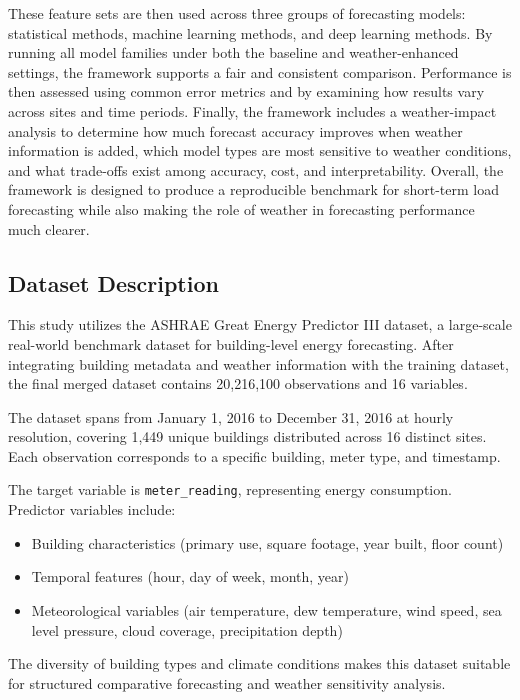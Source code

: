 \documentclass[conference]{IEEEtran}
\begin{document}
These feature sets are then used across three groups of forecasting models: statistical methods, machine learning methods, and deep learning methods. By running all model families under both the baseline and weather-enhanced settings, the framework supports a fair and consistent comparison. Performance is then assessed using common error metrics and by examining how results vary across sites and time periods. Finally, the framework includes a weather-impact analysis to determine how much forecast accuracy improves when weather information is added, which model types are most sensitive to weather conditions, and what trade-offs exist among accuracy, cost, and interpretability. Overall, the framework is designed to produce a reproducible benchmark for short-term load forecasting while also making the role of weather in forecasting performance much clearer.

\subsection{Dataset Description}

This study utilizes the ASHRAE Great Energy Predictor III dataset, a large-scale real-world benchmark dataset for building-level energy forecasting. After integrating building metadata and weather information with the training dataset, the final merged dataset contains 20,216,100 observations and 16 variables.

The dataset spans from January 1, 2016 to December 31, 2016 at hourly resolution, covering 1,449 unique buildings distributed across 16 distinct sites. Each observation corresponds to a specific building, meter type, and timestamp.

The target variable is \texttt{meter\_reading}, representing energy consumption. Predictor variables include:

\begin{itemize}
    \item Building characteristics (primary use, square footage, year built, floor count)
    \item Temporal features (hour, day of week, month, year)
    \item Meteorological variables (air temperature, dew temperature, wind speed, sea level pressure, cloud coverage, precipitation depth)
\end{itemize}

The diversity of building types and climate conditions makes this dataset suitable for structured comparative forecasting and weather sensitivity analysis.
\end{document}
